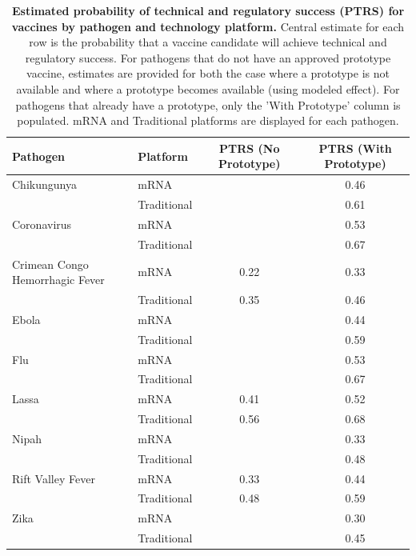 \begin{table}[!htbp]
\caption{\textbf{Estimated probability of technical and regulatory success (PTRS) for vaccines by pathogen and technology platform.} Central estimate for each row is the probability that a vaccine candidate will achieve technical and regulatory success. For pathogens that do not have an approved prototype vaccine, estimates are provided for both the case where a prototype is not available and where a prototype becomes available (using modeled effect). For pathogens that already have a prototype, only the 'With Prototype' column is populated. mRNA and Traditional platforms are displayed for each pathogen.}
\label{tab:ptrs-for-sims}
\begin{tabular}{llcc}
\hline\hline
Pathogen & Platform & PTRS (No Prototype) & PTRS (With Prototype) \\
\hline
Chikungunya & mRNA &  & 0.46 \\
 & Traditional &  & 0.61 \\
Coronavirus & mRNA &  & 0.53 \\
 & Traditional &  & 0.67 \\
Crimean Congo Hemorrhagic Fever & mRNA & 0.22 & 0.33 \\
 & Traditional & 0.35 & 0.46 \\
Ebola & mRNA &  & 0.44 \\
 & Traditional &  & 0.59 \\
Flu & mRNA &  & 0.53 \\
 & Traditional &  & 0.67 \\
Lassa & mRNA & 0.41 & 0.52 \\
 & Traditional & 0.56 & 0.68 \\
Nipah & mRNA &  & 0.33 \\
 & Traditional &  & 0.48 \\
Rift Valley Fever & mRNA & 0.33 & 0.44 \\
 & Traditional & 0.48 & 0.59 \\
Zika & mRNA &  & 0.30 \\
 & Traditional &  & 0.45 \\
\hline\hline
\end{tabular}
\end{table}

